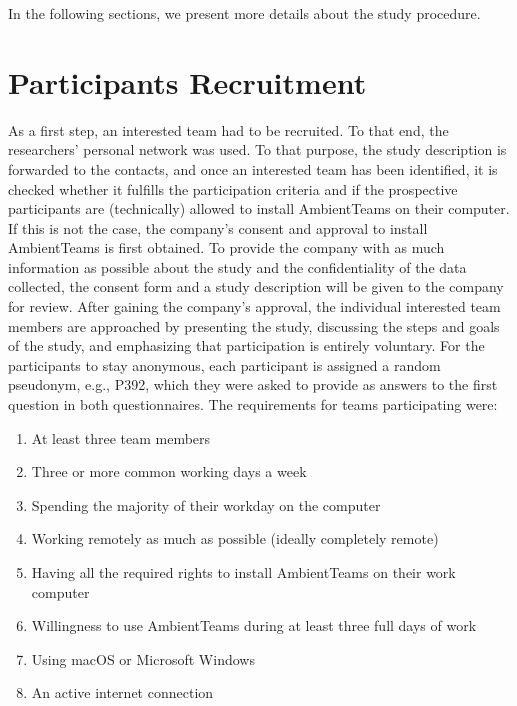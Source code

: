 In the following sections, we present more details about the study procedure.

\section{Participants Recruitment}
\label{section:recruitment}
As a first step, an interested team had to be recruited. To that end, the researchers' personal network was used. To that purpose, the study description is forwarded to the contacts, and once an interested team has been identified, it is checked whether it fulfills the participation criteria and if the prospective participants are (technically) allowed to install AmbientTeams on their computer. If this is not the case, the company's consent and approval to install AmbientTeams is first obtained. To provide the company with as much information as possible about the study and the confidentiality of the data collected, the consent form and a study description will be given to the company for review. After gaining the company's approval, the individual interested team members are approached by presenting the study, discussing the steps and goals of the study, and emphasizing that participation is entirely voluntary. For the participants to stay anonymous, each participant is assigned a random pseudonym, e.g., P392, which they were asked to provide as answers to the first question in both questionnaires. The requirements for teams participating were:

\begin{enumerate}
    \item At least three team members
    \item Three or more common working days a week
    \item Spending the majority of their workday on the computer
    \item Working remotely as much as possible (ideally completely remote)
    \item Having all the required rights to install AmbientTeams on their work computer
    \item Willingness to use AmbientTeams during at least three full days of work
    \item Using macOS or Microsoft Windows
    \item An active internet connection
\end{enumerate}


